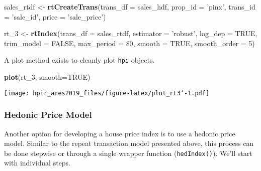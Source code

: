 \documentclass[]{article}
\newenvironment{Shaded}{\begin{snugshade}}{\end{snugshade}}
\newcommand{\DataTypeTok}[1]{\textcolor[rgb]{0.13,0.29,0.53}{#1}}
\newcommand{\DecValTok}[1]{\textcolor[rgb]{0.00,0.00,0.81}{#1}}
\newcommand{\KeywordTok}[1]{\textcolor[rgb]{0.13,0.29,0.53}{\textbf{#1}}}
\newcommand{\NormalTok}[1]{#1}
\newcommand{\OtherTok}[1]{\textcolor[rgb]{0.56,0.35,0.01}{#1}}
\newcommand{\StringTok}[1]{\textcolor[rgb]{0.31,0.60,0.02}{#1}}
\begin{document}
\begin{Shaded}
\begin{Highlighting}[]
\NormalTok{  sales_rtdf <-}\StringTok{ }\KeywordTok{rtCreateTrans}\NormalTok{(}\DataTypeTok{trans_df =}\NormalTok{ sales_hdf,}
                            \DataTypeTok{prop_id =} \StringTok{'pinx'}\NormalTok{,}
                            \DataTypeTok{trans_id =} \StringTok{'sale_id'}\NormalTok{,}
                            \DataTypeTok{price =} \StringTok{'sale_price'}\NormalTok{)}
\end{Highlighting}
\end{Shaded}

\begin{Shaded}
\begin{Highlighting}[]
\NormalTok{  rt_}\DecValTok{3}\NormalTok{ <-}\StringTok{ }\KeywordTok{rtIndex}\NormalTok{(}\DataTypeTok{trans_df =}\NormalTok{ sales_rtdf,}
                  \DataTypeTok{estimator =} \StringTok{'robust'}\NormalTok{,}
                  \DataTypeTok{log_dep =} \OtherTok{TRUE}\NormalTok{,}
                  \DataTypeTok{trim_model =} \OtherTok{FALSE}\NormalTok{,}
                  \DataTypeTok{max_period =} \DecValTok{80}\NormalTok{,}
                  \DataTypeTok{smooth =} \OtherTok{TRUE}\NormalTok{,}
                  \DataTypeTok{smooth_order =} \DecValTok{5}\NormalTok{)}
\end{Highlighting}
\end{Shaded}

A plot method exists to cleanly plot \texttt{hpi} objects.

\begin{Shaded}
\begin{Highlighting}[]
  \KeywordTok{plot}\NormalTok{(rt_}\DecValTok{3}\NormalTok{, }\DataTypeTok{smooth=}\OtherTok{TRUE}\NormalTok{)}
\end{Highlighting}
\end{Shaded}

\texttt{[image: hpir\_ares2019\_files/figure-latex/plot\_rt3`-1.pdf]}

\hypertarget{hedonic-price-model}{%
\subsubsection{Hedonic Price Model}\label{hedonic-price-model}}

Another option for developing a house price index is to use a hedonic
price model. Similar to the repeat transaction model presented above,
this process can be done stepwise or through a single wrapper function
(\texttt{hedIndex()}). We'll start with individual steps.
\end{document}
